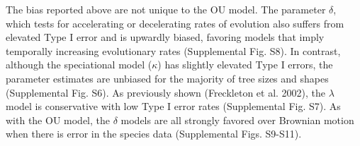 \documentclass[a4paper,12pt]{article}
\begin{document}



The bias %
 reported above are not unique to the OU model. The parameter $\delta$, which tests for accelerating or decelerating rates of evolution \citep{Pagel:1997aa,Pagel:1999aa} also suffers from elevated Type I error and is upwardly biased, favoring models that imply temporally increasing evolutionary rates (Supplemental Fig. S8). In contrast, although the speciational model ($\kappa$) has slightly elevated Type I errors, the parameter estimates are unbiased for the majority of tree sizes and shapes (Supplemental Fig. S6). As previously shown (Freckleton et al. 2002), the $\lambda$ model is conservative with low Type I error rates (Supplemental Fig. S7). As with the OU model, the $\delta$ models are all strongly favored over Brownian motion when there is error in the species data (Supplemental Figs. S9-S11). 
\end{document}

